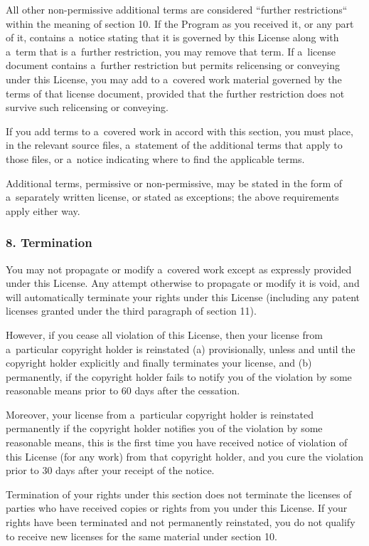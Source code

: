 \documentclass[a4paper, 11pt, twoside]{article}
\begin{document}
All other non-permissive additional terms are considered “further restrictions“ within the meaning of section 10. If the Program as you received it, or any part of it, contains a~notice stating that it is governed by this License along with a~term that is a~further restriction, you may remove that term. If a~license document contains a~further restriction but permits relicensing or conveying under this License, you may add to a~covered work material governed by the terms of that license document, provided that the further restriction does not survive such relicensing or conveying.

If you add terms to a~covered work in accord with this section, you must place, in the relevant source files, a~statement of the additional terms that apply to those files, or a~notice indicating where to find the applicable terms.

Additional terms, permissive or non-permissive, may be stated in the form of a~separately written license, or stated as exceptions; the above requirements apply either way.

\subsubsection{8. Termination}

You may not propagate or modify a~covered work except as expressly provided under this License. Any attempt otherwise to propagate or modify it is void, and will automatically terminate your rights under this License (including any patent licenses granted under the third paragraph of section 11).

However, if you cease all violation of this License, then your license from a~particular copyright holder is reinstated (a) provisionally, unless and until the copyright holder explicitly and finally terminates your license, and (b) permanently, if the copyright holder fails to notify you of the violation by some reasonable means prior to 60 days after the cessation.

Moreover, your license from a~particular copyright holder is reinstated permanently if the copyright holder notifies you of the violation by some reasonable means, this is the first time you have received notice of violation of this License (for any work) from that copyright holder, and you cure the violation prior to 30 days after your receipt of the notice.

Termination of your rights under this section does not terminate the licenses of parties who have received copies or rights from you under this License. If your rights have been terminated and not permanently reinstated, you do not qualify to receive new licenses for the same material under section 10.
\end{document}
